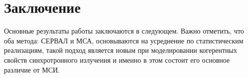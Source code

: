 \chapter*{Заключение}						%


Основные результаты работы заключаются в следующем.
%
Важно отметить, что оба метода: СЕРВАЛ и МСА, основываются на усреднение по статистическим реализациям, такой подход является новым при моделировании когерентных свойств синхротронного излучения и именно в этом состоит его основное различие от МСИ. 
